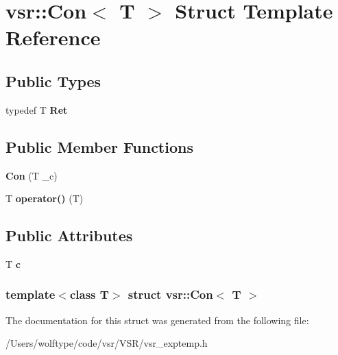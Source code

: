 \hypertarget{structvsr_1_1_con}{\section{vsr\-:\-:Con$<$ T $>$ Struct Template Reference}
\label{structvsr_1_1_con}
}
\subsection*{Public Types}
\begin{DoxyCompactItemize}
\item 
\hypertarget{structvsr_1_1_con_a44a1e8f953f29ccd461d010b505bd5e0}{typedef T {\bfseries Ret}}\label{structvsr_1_1_con_a44a1e8f953f29ccd461d010b505bd5e0}

\end{DoxyCompactItemize}
\subsection*{Public Member Functions}
\begin{DoxyCompactItemize}
\item 
\hypertarget{structvsr_1_1_con_aa148bf3ce8be27e8e03eac051af81203}{{\bfseries Con} (T \-\_\-c)}\label{structvsr_1_1_con_aa148bf3ce8be27e8e03eac051af81203}

\item 
\hypertarget{structvsr_1_1_con_a0a4e96e123cfb8a382bfd2b3a55dbf86}{T {\bfseries operator()} (T)}\label{structvsr_1_1_con_a0a4e96e123cfb8a382bfd2b3a55dbf86}

\end{DoxyCompactItemize}
\subsection*{Public Attributes}
\begin{DoxyCompactItemize}
\item 
\hypertarget{structvsr_1_1_con_a411c626f2d173e19940935a975488bb1}{T {\bfseries c}}\label{structvsr_1_1_con_a411c626f2d173e19940935a975488bb1}

\end{DoxyCompactItemize}
\subsubsection*{template$<$class T$>$ struct vsr\-::\-Con$<$ T $>$}



The documentation for this struct was generated from the following file\-:\begin{DoxyCompactItemize}
\item 
/\-Users/wolftype/code/vsr/\-V\-S\-R/vsr\-\_\-exptemp.\-h\end{DoxyCompactItemize}

